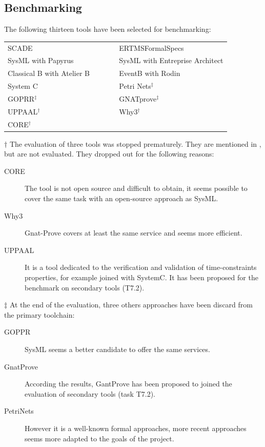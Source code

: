 \subsection{Benchmarking}
\label{sec:benchmarking}

The following thirteen tools have been selected for benchmarking:

\begin{tabular}{ p{0.5\linewidth} p{0.5\linewidth} }
SCADE & ERTMSFormalSpecs \\
SysML with Papyrus & SysML with Entreprise Architect \\
Classical B with Atelier B & EventB with Rodin \\
System C & Petri Nets$^\ddagger$ \\
GOPRR$^\ddagger$ & GNATprove$^\ddagger$ \\
UPPAAL$^\dagger$ & Why3$^\dagger$ \\
CORE$^\dagger$
\end{tabular}

$\dagger$ The evaluation of three tools was stopped prematurely.  They are mentioned in \cite{WP7_O719}, but are not evaluated.  They dropped out for the following reasons:

\begin{description}
\item[CORE] The tool is not open source and difficult to obtain, it seems possible to cover the same task with an open-source approach as SysML.
\item[Why3] Gnat-Prove covers at least the same service and seems more efficient.
\item[UPPAAL] It is a tool dedicated to the verification and validation of time-constraints properties, for example joined with SystemC. It has been proposed for the benchmark on secondary tools (T7.2).
\end{description}

$\ddagger$ At the end of the evaluation, three others approaches have been discard from the primary toolchain:

\begin{description}
\item[GOPPR] SysML seems a better candidate to offer the same services.
\item[GnatProve] According the results, GantProve has been proposed to joined the evaluation of secondary tools (task T7.2).
\item[PetriNets] However it is a well-known formal approaches, more recent approaches seems more adapted to the goals of the project.
\end{description}

